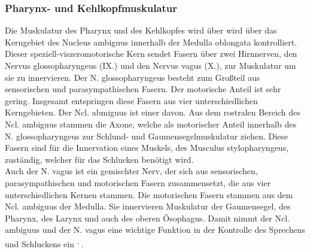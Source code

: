 \documentclass[12pt,a4paper,pdftex]{article}
\begin{document}
\subsubsection*{Pharynx- und Kehlkopfmuskulatur}
Die Muskulatur des Pharynx und des Kehlkopfes wird über wird über das Kerngebiet des Nucleus ambiguus  innerhalb der Medulla oblongata kontrolliert. Dieser speziell-viszeromotorische Kern sendet Fasern über zwei Hirnnerven, den Nervus glossopharyngeus (IX.)  und den Nervus vagus (X.), zur Muskulatur um sie zu innervieren. Der N. glossopharyngeus besteht zum Großteil aus sensorischen und parasympathischen Fasern. Der motorische Anteil ist sehr gering. Insgesamt entspringen diese Fasern aus vier unterschiedlichen Kerngebieten. Der Ncl. abmiguus ist einer davon. Aus dem rostralen Bereich des Ncl. ambiguus stammen die Axone, welche als motorischer Anteil innerhalb des N. glossopharyngeus zur Schlund- und Gaumensegelmuskulatur ziehen. Diese Fasern sind für die Innervation eines Muskels, des Musculus stylopharyngeus, zuständig, welcher für das Schlucken benötigt wird. \\
Auch der N. vagus ist ein gemischter Nerv, der sich aus sensorischen, parasympathischen und motorischen Fasern zusammensetzt, die aus vier unterschiedlichen Kernen stammen. Die motorischen Fasern stammen aus dem Ncl. ambiguus der Medulla. Sie innervieren Muskulatur der Gaumensegel, des Pharynx, des Larynx und auch des oberen Ösophagus. Damit nimmt der Ncl. ambiguus und der N. vagus eine wichtige Funktion in der Kontrolle des Sprechens und Schluckens ein \textsuperscript{\cite[10]{crossman2014neuroanatomy}, \cite[5]{trepel2011neuroanatomie}}.       
\end{document}
